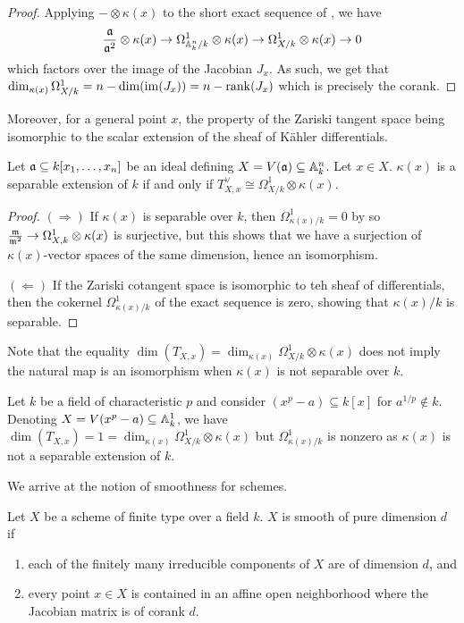 \begin{proof}
    Applying $-\otimes\kappa(x)$ to the short exact sequence of , we have 
    $$\frac{\mathfrak{a}}{\mathfrak{a}^{2}}\otimes\kappa(x)\to\Omega^{1}_{\mathbb{A}^{n}_{k}/k}\otimes\kappa(x)\to\Omega_{X/k}^{1}\otimes\kappa(x)\to0$$
    which factors over the image of the Jacobian $J_{x}$. As such, we get that $\dim_{\kappa(x)}\Omega_{X/k}^{1}=n-\dim(\mathrm{im}(J_{x}))=n-\mathrm{rank}(J_{x})$ which is precisely the corank. 
\end{proof}
Moreover, for a general point $x$, the property of the Zariski tangent space being isomorphic to the scalar extension of the sheaf of K\"{a}hler differentials. 
\begin{proposition}
    Let $\mathfrak{a}\subseteq k[x_{1},\dots,x_{n}]$ be an ideal defining $X=V(\mathfrak{a})\subseteq \mathbb{A}^{n}_{k}$. Let $x\in X$. $\kappa(x)$ is a separable extension of $k$ if and only if $T_{X,x}^{\vee}\cong\Omega_{X/k}^{1}\otimes\kappa(x)$. 
\end{proposition}
\begin{proof}
    $(\Rightarrow)$ If $\kappa(x)$ is separable over $k$, then $\Omega_{\kappa(x)/k}^{1}=0$ by  so $\frac{\mathfrak{m}}{\mathfrak{m}^{2}}\to\Omega_{X,k}^{1}\otimes\kappa(x)$ is surjective, but this shows that we have a surjection of $\kappa(x)$-vector spaces of the same dimension, hence an isomorphism. 

    $(\Leftarrow)$ If the Zariski cotangent space is isomorphic to teh sheaf of differentials, then the cokernel $\Omega^{1}_{\kappa(x)/k}$ of the exact sequence  is zero, showing that $\kappa(x)/k$ is separable. 
\end{proof}
Note that the equality $\dim(T_{X,x})=\dim_{\kappa(x)}\Omega^{1}_{X/k}\otimes\kappa(x)$ does not imply the natural map is an isomorphism when $\kappa(x)$ is not separable over $k$. 
\begin{example}
    Let $k$ be a field of characteristic $p$ and consider $(x^{p}-a)\subseteq k[x]$ for $a^{1/p}\notin k$. Denoting $X=V(x^{p}-a)\subseteq\mathbb{A}^{1}_{k}$, we have $\dim(T_{X,x})=1=\dim_{\kappa(x)}\Omega^{1}_{X/k}\otimes\kappa(x)$ but $\Omega^{1}_{\kappa(x)/k}$ is nonzero as $\kappa(x)$ is not a separable extension of $k$. 
\end{example}
We arrive at the notion of smoothness for schemes. 
\begin{definition}\label{def: smooth scheme}
    Let $X$ be a scheme of finite type over a field $k$. $X$ is smooth of pure dimension $d$ if 
    \begin{enumerate}[label=(\roman*)]
        \item each of the finitely many irreducible components of $X$ are of dimension $d$, and 
        \item every point $x\in X$ is contained in an affine open neighborhood where the Jacobian matrix is of corank $d$. 
    \end{enumerate}
\end{definition}
